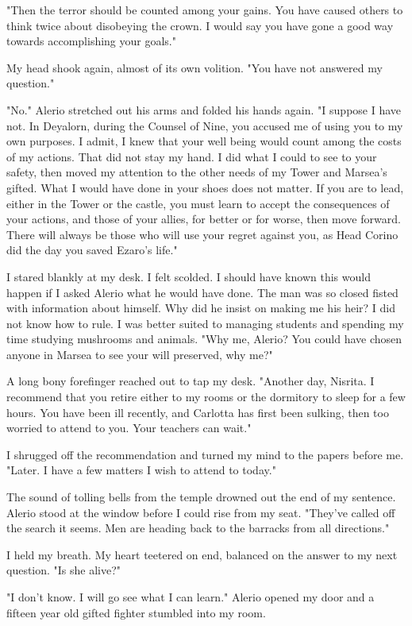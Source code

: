 \documentclass{article}
\begin{document}
"Then the terror should be counted among your gains. You have caused others to think twice about disobeying the crown. I would say you have gone a good way towards accomplishing your goals."

My head shook again, almost of its own volition. "You have not answered my question."

"No." Alerio stretched out his arms and folded his hands again. "I suppose I have not. In Deyalorn, during the Counsel of Nine, you accused me of using you to my own purposes. I admit, I knew that your well being would count among the costs of my actions. That did not stay my hand. I did what I could to see to your safety, then moved my attention to the other needs of my Tower and Marsea's gifted. What I would have done in your shoes does not matter. If you are to lead, either in the Tower or the castle, you must learn to accept the consequences of your actions, and those of your allies, for better or for worse, then move forward. There will always be those who will use your regret against you, as Head Corino did the day you saved Ezaro's life."

I stared blankly at my desk. I felt scolded. I should have known this would happen if I asked Alerio what he would have done. The man was so closed fisted with information about himself. Why did he insist on making me his heir? I did not know how to rule. I was better suited to managing students and spending my time studying mushrooms and animals. "Why me, Alerio? You could have chosen anyone in Marsea to see your will preserved, why me?"

A long bony forefinger reached out to tap my desk. "Another day, Nisrita. I recommend that you retire either to my rooms or the dormitory to sleep for a few hours. You have been ill recently, and Carlotta has first been sulking, then too worried to attend to you. Your teachers can wait."

I shrugged off the recommendation and turned my mind to the papers before me. "Later. I have a few matters I wish to attend to today."

The sound of tolling bells from the temple drowned out the end of my sentence. Alerio stood at the window before I could rise from my seat. "They've called off the search it seems. Men are heading back to the barracks from all directions."

I held my breath. My heart teetered on end, balanced on the answer to my next question. "Is she alive?"

"I don't know. I will go see what I can learn." Alerio opened my door and a fifteen year old gifted fighter stumbled into my room.
\end{document}
